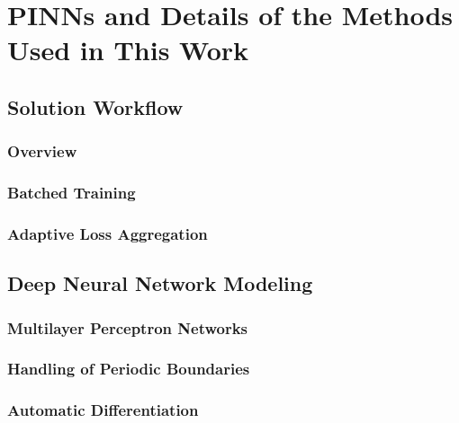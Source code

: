 \chapter{PINNs and Details of the Methods Used in This Work}\label{chap:pinn}

\section{Solution Workflow}\label{sec:pinn-workflow-overview}

    \subsection{Overview}\label{sec:pinn-overview}
    

    \subsection{Batched Training}\label{sec:batched-training}
    

    \subsection{Adaptive Loss Aggregation}\label{sec:loss-annealing}
    

\section{Deep Neural Network Modeling}\label{sec:pinn-dnnm}

    \subsection{Multilayer Perceptron Networks}\label{sec:mlp}
    

    \subsection{Handling of Periodic Boundaries}\label{sec:periodic-boundary}
    

    \subsection{Automatic Differentiation}\label{sec:ad}
    

